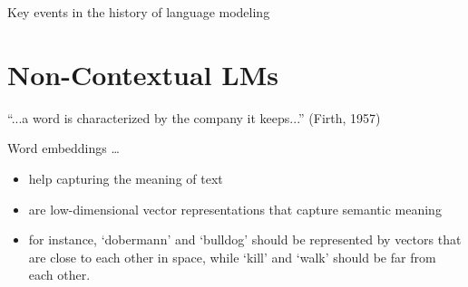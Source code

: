\documentclass[compress]{beamer}
\begin{document}
\begin{frame}{Key events in the history of language modeling}
\end{frame}


\section{Non-Contextual LMs}

\begin{frame}{``...a word is characterized by the company it keeps...'' (Firth, 1957)}
	\begin{block}{Word embeddings \ldots}
		\begin{itemize}
			\item help capturing the meaning of text
			\item are low-dimensional vector representations that capture semantic meaning
			\item for instance, `dobermann' and `bulldog' should be represented by vectors that are close to each other in space, while `kill' and `walk' should be far from each other.
		\end{itemize}
	\end{block}
\end{frame}
\end{document}
